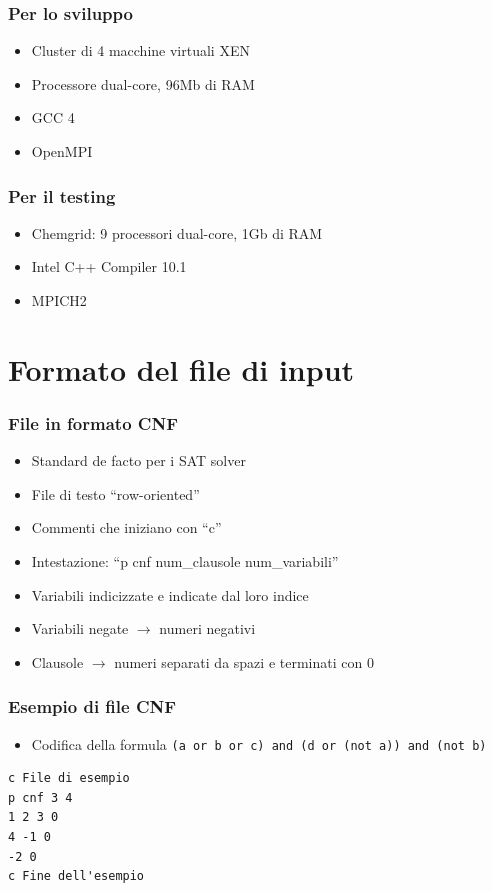 \documentclass[12pt,xcolor=dvipsnames]{beamer}
\begin{document}
\begin{frame}
	\frametitle{Per lo sviluppo}
	\begin{itemize}
	 \item Cluster di 4 macchine virtuali XEN \pause
	 \item Processore dual-core, 96Mb di RAM \pause
	 \item GCC 4 \pause
     \item OpenMPI
	\end{itemize}
\end{frame}

\begin{frame}
	\frametitle{Per il testing}
	\begin{itemize}
	 \item Chemgrid: 9 processori dual-core, 1Gb di RAM\pause
	 \item Intel C++ Compiler 10.1 \pause
	 \item MPICH2
	\end{itemize}
\end{frame}

\section{Formato del file di input}

\begin{frame}
	\frametitle{File in formato CNF}
	\begin{itemize}
	 \item Standard de facto per i SAT solver \pause
     \item File di testo ``row-oriented'' \pause
	 \item Commenti che iniziano con ``c'' \pause
     \item Intestazione: ``p cnf num\_clausole num\_variabili'' \pause
	 \item Variabili indicizzate e indicate dal loro indice \pause
     \item Variabili negate $\rightarrow$ numeri negativi \pause
     \item Clausole $\rightarrow$ numeri separati da spazi e terminati con 0
	\end{itemize}
\end{frame}

\begin{frame}[fragile]
    \frametitle{Esempio di file CNF}
    \begin{itemize}
     \item Codifica della formula \verb|(a or b or c) and (d or (not a)) and (not b)|
    \end{itemize} \pause
\begin{lstlisting}
c File di esempio
p cnf 3 4
1 2 3 0
4 -1 0
-2 0
c Fine dell'esempio
\end{lstlisting}
\end{frame}
\end{document}
